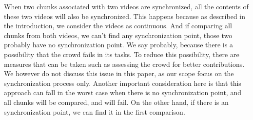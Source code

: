When two chunks associated with two videos are synchronized, all the contents of these two videos will also be synchronized. This happens because as described in the introduction, we consider the videos as continuous. And if comparing all chunks from both videos, we can't find any synchronization point, those two probably have no synchronization point. We say probably, because there is a possibility that the crowd fails in its tasks. To reduce this possibility, there are measures that can be taken such as assessing the crowd for better contributions. We however do not discuss this issue in this paper, as our scope focus on the synchronization process only. Another important consideration here is that this approach can fall in the worst case when there is no synchronization point, and all chunks will be compared, and will fail. On the other hand, if there is an synchronization point, we can find it in the first comparison.